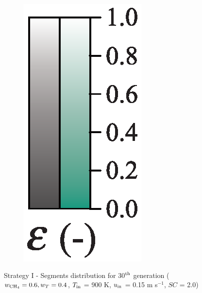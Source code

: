 \documentclass[preprint,12pt]{elsarticle}
\begin{document}
\begin{figure}[h!]
\begin{subfigure}[b]{0.1\textwidth}
     	\includegraphics[width=\textwidth]{segments_porosity.eps}
     \end{subfigure}
\caption{\label{fig:30L6040G1-TField} Strategy I - Segments distribution for 30$^{\rm{th}}$ generation ($w_{\rm{CH_4}} = 0.6, w_T = 0.4$, $T_{\rm{in}}$ = 900 K, $u_{\rm{in}}$ = 0.15 m s$^{-1}$, $SC$ = 2.0)}
\end{figure}
\end{document}
